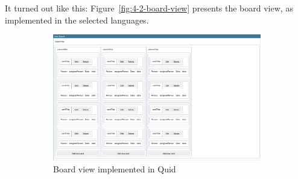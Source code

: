 It turned out like this:
Figure~\ref{fig:4-2-board-view} presents the board view, as implemented in the selected languages.
\begin{figure}
    \centering
    \begin{subfigure}[m]{0.6\textwidth}
        \centering
        \includegraphics[height=0.25\textheight]{./4-results-and-discussion/quid-board-view}
        \caption{Board view implemented in Quid}
        \label{fig:4-2-quid-board-view}
    \end{subfigure}
    \hfill
    \begin{subfigure}[m]{0.35\textwidth}
        \centering

\end{subfigure}
\end{figure}

